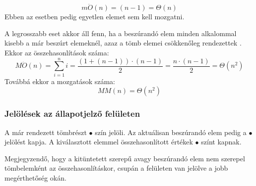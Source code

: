 \documentclass{elteikthesis}
\newcommand{\hiddensubsubsection}[1]{
	\stepcounter{subsubsection}
	\subsubsection*{{#1}}	
}
\begin{document}
$$m\ddot{O}(n)=(n-1)=\Theta(n)$$
Ebben az esetben pedig egyetlen elemet sem kell mozgatni.\par
A legrosszabb eset akkor áll fenn, ha a beszúrandó elem minden alkalommal kisebb a már beszúrt elemeknél, azaz a tömb elemei csökkenőleg rendezettek \cite{Fekete}. Ekkor az összehasonlítások száma:
$$M\ddot{O}(n)=\sum\limits_{i=1}^n i = \frac{(1+(n-1))\cdot(n-1)}{2}=\frac{n\cdot(n-1)}{2}=\Theta(n^2)$$
Továbbá ekkor a mozgatások száma:
$$MM(n)=\Theta(n^2)$$
\hiddensubsubsection{Jelölések az állapotjelző felületen}
A már rendezett tömbrészt \textcolor{done}{\Huge$\bullet$} szín jelöli. Az aktuálisan beszúrandó elem pedig a \textcolor{select}{\Huge$\bullet$} jelölést kapja. A kiválasztott elemmel összehasonlított értékek \textcolor{swap}{\Huge$\bullet$} színt kapnak.\par
Megjegyzendő, hogy a kitüntetett szerepű avagy beszúrandó elem nem szerepel tömbelemként az összehasonlításkor, csupán a felületen van jelölve a jobb megérthetőség okán.
\end{document}
